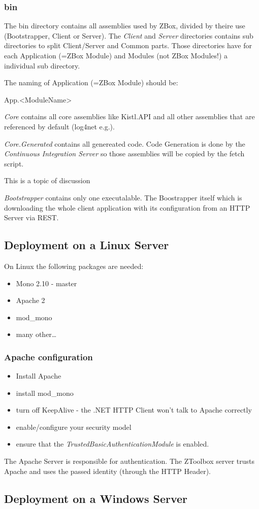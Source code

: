 \subsubsection{bin}
The bin directory contains all assemblies used by ZBox, divided by theire use
(Bootstrapper, Client or Server). The \emph{Client} and \emph{Server}
directories contains sub directories to split Client/Server and Common parts.
Those directories have for each Application (=ZBox Module) and Modules (not ZBox
Modules!) a individual sub directory.

The naming of Application (=ZBox Module) should be:

\begin{center}
App.\textless ModuleName\textgreater  
\end{center}

\emph{Core} contains all core assemblies like Kistl.API and all other
assemblies that are referenced by default (log4net e.g.).

\emph{Core.Generated} contains all genereated code. Code Generation is done by
the \emph{Continuous Integration Server} so those assemblies will be copied by
the fetch script.

\begin{note}
This is a topic of discussion
\end{note}

\emph{Bootstrapper} contains only one executalable. The Boostrapper itself which
is downloading the whole client application with its configuration from an HTTP
Server via REST.

\subsection{Deployment on a Linux Server}

On Linux the following packages are needed:

\begin{itemize}
  \item Mono 2.10 - master
  \item Apache 2
  \item mod\_mono
  \item many other\ldots
 \end{itemize}

\subsubsection{Apache configuration}

\begin{itemize}
\item Install Apache
\item install mod\_mono
\item turn off KeepAlive - the .NET HTTP Client won't talk to Apache correctly 
\item enable/configure your security model
\item ensure that the
\emph{TrustedBasicAuthenticationModule} is enabled.
\end{itemize}

The Apache Server is responsible for authentication. The ZToolbox server trusts
Apache and uses the passed identity (through the HTTP Header).
 

\subsection{Deployment on a Windows Server}
